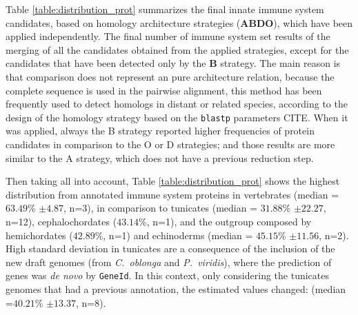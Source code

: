 \documentclass[11pt]{article}
\newcommand{\TODO}[1]{\begingroup\color{red}#1\endgroup}
\begin{document}
Table \ref{table:distribution_prot} summarizes the final innate immune system 
candidates, based on homology architecture strategies (\textbf{ABDO}), which 
have been applied independently. The final number of immune system set results 
of the merging of all the candidates obtained from the applied strategies, 
except for the candidates that have been detected only by the \textbf{B} 
strategy. The main reason is that comparison does not represent an 
pure architecture relation, because the complete sequence is used in the 
pairwise alignment, this method has been frequently used to detect homologs 
in distant or related species, according to the design of the homology strategy 
based on the \texttt{blastp} parameters \TODO{CITE}. When it was applied, 
always the B strategy reported higher frequencies of protein candidates in 
comparison to the O or D strategies; and those results are more similar to the 
A strategy, which does not have a previous reduction step. 

Then taking all into account, Table \ref{table:distribution_prot} shows the 
highest distribution from annotated immune system proteins in vertebrates 
(median = $63.49$\% $\pm 4.87$, n=3), in comparison to tunicates 
(median = $31.88$\% $\pm 22.27$, n=12), cephalochordates ($43.14$\%, n=1), and the
outgroup composed by hemichordates ($42.89$\%, n=1) and echinoderms 
(median = $45.15$\% $\pm 11.56$, n=2). High standard deviation in tunicates are 
a consequence of the inclusion of the new draft genomes (from \textit{C.\ oblonga} 
and \textit{P.\ viridis}), where the prediction of genes was \textsl{de novo} 
by \texttt{GeneId}. In this context, only considering the tunicates genomes that 
had a previous annotation, the estimated values changed: (median =$40.21$\% $\pm 13.37$, n=8).
\end{document}
